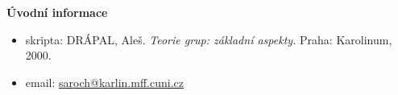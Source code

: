 %
{}

\begin{center}
	{\bfseries\Large Úvodní informace}\par\vspace{1em}
\end{center}

\begin{itemize}
	\item skripta: DRÁPAL, Aleš. \textit{Teorie grup: základní aspekty.} Praha: Karolinum, 2000.
	\item email: \href{mailto:saroch@karlin.mff.cuni.cz}{saroch@karlin.mff.cuni.cz}
\end{itemize}
